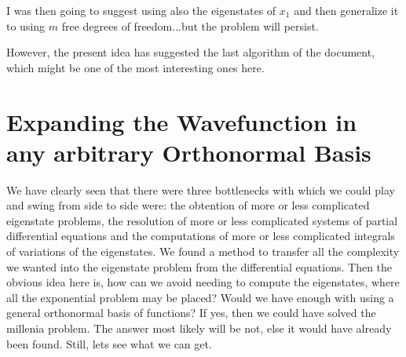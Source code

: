 \documentclass[11pt, a4paper]{article} %
\begin{document}
I was then going to suggest using also the eigenstates of $x_1$ and then generalize it to using $m$ free degrees of freedom...but the problem will persist. 

However, the present idea has suggested the last algorithm of the document, which might be one of the most interesting ones here.


\newpage
\section{Expanding the Wavefunction in any arbitrary Orthonormal Basis}
We have clearly seen that there were three bottlenecks with which we could play and swing from side to side were: the obtention of more or less complicated eigenstate problems, the resolution of more or less complicated systems of partial differential equations and the computations of more or less complicated integrals of variations of the eigenstates. We found a method to transfer all the complexity we wanted into the eigenstate problem from the differential equations. Then the obvious idea here is, how can we avoid needing to compute the eigenstates, where all the exponential problem may be placed? Would we have enough with using a general orthonormal basis of functions? If yes, then we could have solved the millenia problem. The answer most likely will be not, else it would have already been found. Still, lets see what we can get.
\end{document}
